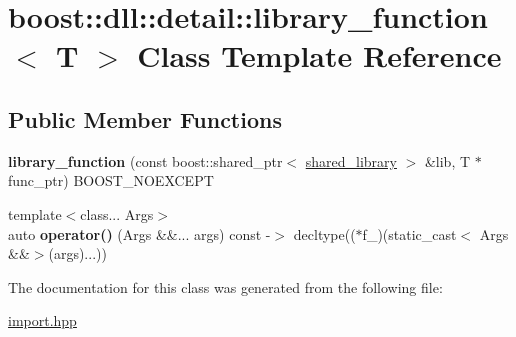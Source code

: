\hypertarget{a01632}{}\section{boost\+:\+:dll\+:\+:detail\+:\+:library\+\_\+function$<$ T $>$ Class Template Reference}
\label{a01632}
\subsection*{Public Member Functions}
\begin{DoxyCompactItemize}
\item 
\mbox{\label{a01632_ad09ab3a2ca8c6c1bd8591edaa08d7d30}} 
{\bfseries library\+\_\+function} (const boost\+::shared\+\_\+ptr$<$ \hyperlink{a01708}{shared\+\_\+library} $>$ \&lib, T $\ast$func\+\_\+ptr) B\+O\+O\+S\+T\+\_\+\+N\+O\+E\+X\+C\+E\+PT
\item 
\mbox{\label{a01632_a13b3b5fa7b7eacddfb69945d4b82e985}} 
{\footnotesize template$<$class... Args$>$ }\\auto {\bfseries operator()} (Args \&\&... args) const -\/$>$ decltype(($\ast$f\+\_\+)(static\+\_\+cast$<$ Args \&\&$>$(args)...))
\end{DoxyCompactItemize}


The documentation for this class was generated from the following file\+:\begin{DoxyCompactItemize}
\item 
\hyperlink{a00254}{import.\+hpp}\end{DoxyCompactItemize}
